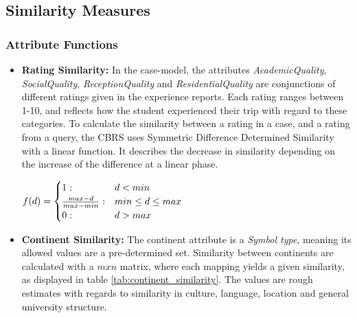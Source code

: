 \subsection{Similarity Measures}

\subsubsection{Attribute Functions}


\begin{itemize}
    \item \textbf{Rating Similarity:} In the case-model, the attributes \emph{AcademicQuality}, \emph{SocialQuality}, \emph{ReceptionQuality} and \emph{ResidentialQuality} are conjunctions of different ratings given in the experience reports. Each rating ranges between 1-10, and reflects how the student experienced their trip with regard to these categories. To calculate the similarity between a rating in a case, and a rating from a query, the CBRS uses Symmetric Difference Determined Similarity\cite{bergmann2002experience} with a linear function. It describes the decrease in similarity depending on the increase of the difference at a linear phase.
    
$\begin{displaystyle}
    f(d) = 
    \begin{cases} 1 : & d < min \\ 
    \frac{max-d}{max-min} : & min \leq d \leq max \\
    0 : & d > max
    \end{cases}
\end{displaystyle}$

    \item \textbf{Continent Similarity:} The continent attribute is a \emph{Symbol type}, meaning its allowed values are a pre-determined set. Similarity between continents are calculated with a $m x n$ matrix, where each mapping yields a given similarity, as displayed in table \ref{tab:continent_similarity}. The values are rough estimates with regards to similarity in culture, language, location and general university structure.


\end{itemize}
